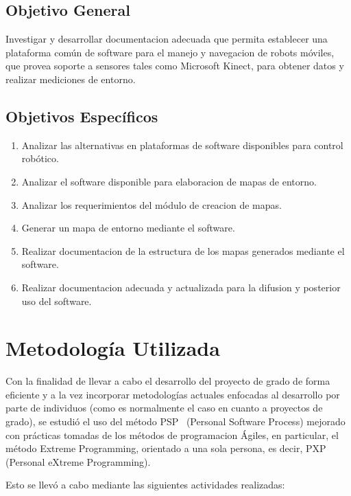 \subsection{Objetivo General}

Investigar y desarrollar documentacion adecuada que permita establecer una plataforma común de software para el manejo y navegacion de robots móviles, que provea soporte a sensores tales como Microsoft Kinect, para obtener datos y realizar mediciones de entorno.

\subsection{Objetivos Específicos}

\begin{enumerate}
	\itemsep1pt \parskip1pt 
	\item Analizar las alternativas en plataformas de software disponibles para control robótico.
	\item Analizar el software disponible para elaboracion de mapas de entorno.
	\item Analizar los requerimientos del módulo de creacion de mapas.
	\item Generar un mapa de entorno mediante el software.
	\item Realizar documentacion de la estructura de los mapas generados mediante el software.
	\item Realizar documentacion adecuada y actualizada para la difusion y posterior uso del software.
\end{enumerate}

\section{Metodología Utilizada}

Con la finalidad de llevar a cabo el desarrollo del proyecto de grado de forma eficiente y a la vez incorporar metodologías actuales enfocadas al desarrollo por parte de individuos (como es normalmente el caso en cuanto a proyectos de grado), se estudió el uso del método PSP~\citep{Humphrey200503} (Personal Software Process) mejorado con prácticas tomadas de los métodos de programacion Ágiles, en particular, el método Extreme Programming, orientado a una sola persona, es decir, PXP~\citep{pxppaper} (Personal eXtreme Programming).

Esto se llevó a cabo mediante las siguientes actividades realizadas:

